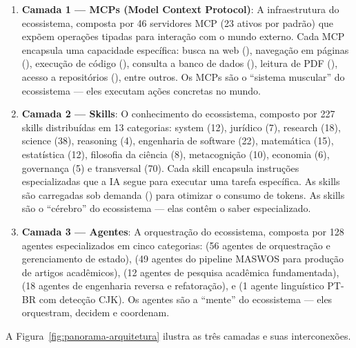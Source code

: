 \begin{enumerate}
  \item \textbf{Camada 1 --- MCPs (Model Context Protocol)}: A
        infraestrutura do ecossistema, composta por 46 servidores MCP (23
        ativos por padrão) que expõem operações tipadas para interação com
        o mundo externo. Cada MCP encapsula uma capacidade específica:
        busca na web (), navegação em páginas
        (), execução de código (),
        consulta a banco de dados (), leitura de PDF
        (), acesso a repositórios (), entre
        outros. Os MCPs são o ``sistema muscular'' do ecossistema --- eles
        executam ações concretas no mundo.

  \item \textbf{Camada 2 --- Skills}: O conhecimento do ecossistema,
        composto por 227 skills distribuídas em 13 categorias: system (12),
        jurídico (7), research (18), science (38), reasoning (4),
        engenharia de software (22), matemática (15), estatística (12),
        filosofia da ciência (8), metacognição (10), economia (6),
        governança (5) e transversal (70). Cada skill encapsula instruções
        especializadas que a IA segue para executar uma tarefa específica.
        As skills são carregadas sob demanda () para
        otimizar o consumo de tokens. As skills são o ``cérebro'' do
        ecossistema --- elas contêm o saber especializado.

  \item \textbf{Camada 3 --- Agentes}: A orquestração do ecossistema,
        composta por 128 agentes especializados em cinco categorias:
         (56 agentes de orquestração e gerenciamento de
        estado),  (49 agentes do pipeline MASWOS para
        produção de artigos acadêmicos),  (12 agentes de
        pesquisa acadêmica fundamentada),  (18 agentes de
        engenharia reversa e refatoração), e  (1 agente
        linguístico PT-BR com detecção CJK). Os agentes são a ``mente''
        do ecossistema --- eles orquestram, decidem e coordenam.
\end{enumerate}

A Figura~\ref{fig:panorama-arquitetura} ilustra as três camadas e suas
interconexões.

